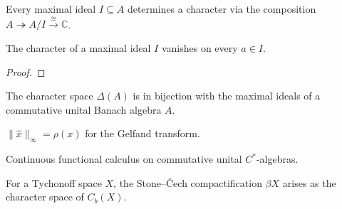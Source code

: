 \begin{definition}
  \label{def:maximal-ideal-character}
  \leanok
  Every maximal ideal $I \subseteq A$ determines a character via the
  composition $A \twoheadrightarrow A/I \xrightarrow{\cong} \mathbb{C}$.
\end{definition}

\begin{theorem}
  \label{thm:max-ideal-char-zero}
  \leanok
  The character of a maximal ideal $I$ vanishes on every $a \in I$.
\end{theorem}
\begin{proof}
  \leanok
\end{proof}


\begin{theorem}
  \label{thm:character-maxIdeal-bijection}
  \leanok
  The character space $\Delta(A)$ is in bijection with the maximal
  ideals of a commutative unital Banach algebra $A$.
\end{theorem}

\begin{theorem}[Rudin 11.13, $\|\widehat{x}\|_\infty = \rho(x)$]
  \label{thm:gelfand-norm-spectralRadius}
  \leanok
  $\|\widehat{x}\|_\infty = \rho(x)$ for the Gelfand transform.
\end{theorem}

\begin{theorem}
  \label{thm:cfc-commutative}
  \leanok
  Continuous functional calculus on commutative unital
  $C^*$-algebras.
\end{theorem}

\begin{theorem}
  \label{thm:stoneCech-via-characters}
  \leanok
  For a Tychonoff space $X$, the Stone--Čech compactification $\beta
  X$ arises as the character space of $C_b(X)$.
\end{theorem}

